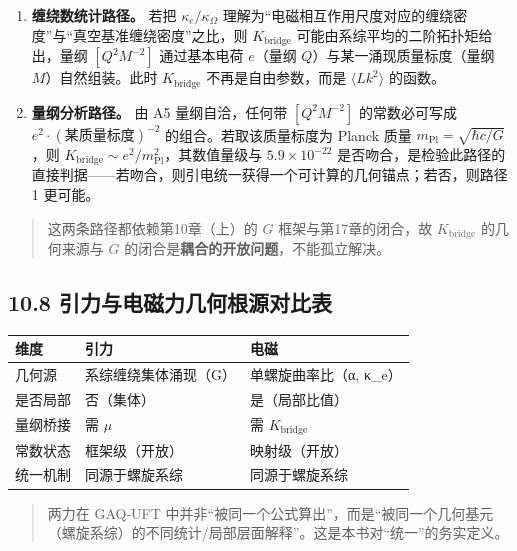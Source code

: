 \begin{enumerate}
\def\labelenumi{\arabic{enumi}.}
\tightlist
\item
  \textbf{缠绕数统计路径。} 若把 \(\kappa_e/\kappa_\Omega\)
  理解为``电磁相互作用尺度对应的缠绕密度''与``真空基准缠绕密度''之比，则
  \(K_{\mathrm{bridge}}\) 可能由系综平均的二阶拓扑矩给出，量纲
  \([Q^2M^{-2}]\) 通过基本电荷 \(e\)（量纲
  \(Q\)）与某一涌现质量标度（量纲 \(M\)）自然组装。此时
  \(K_{\mathrm{bridge}}\) 不再是自由参数，而是 \(\langle Lk^2\rangle\)
  的函数。
\item
  \textbf{量纲分析路径。} 由 A5 量纲自洽，任何带 \([Q^2M^{-2}]\)
  的常数必可写成 \(e^2\cdot(\text{某质量标度})^{-2}\)
  的组合。若取该质量标度为 Planck 质量
  \(m_{\mathrm{Pl}}=\sqrt{\hbar c/G}\)，则
  \(K_{\mathrm{bridge}}\sim e^2/m_{\mathrm{Pl}}^2\)，其数值量级与
  \(5.9\times10^{-22}\)
  是否吻合，是检验此路径的直接判据------若吻合，则引电统一获得一个可计算的几何锚点；若否，则路径
  1 更可能。
\end{enumerate}

\begin{quote}
这两条路径都依赖第10章（上）的 \(G\) 框架与第17章的闭合，故
\(K_{\mathrm{bridge}}\) 的几何来源与 \(G\)
的闭合是\textbf{耦合的开放问题}，不能孤立解决。
\end{quote}

\subsection{10.8
引力与电磁力几何根源对比表}\label{ux5f15ux529bux4e0eux7535ux78c1ux529bux51e0ux4f55ux6839ux6e90ux5bf9ux6bd4ux8868}

\begin{longtable}[]{@{}lll@{}}
\toprule\noalign{}
维度 & 引力 & 电磁 \\
\midrule\noalign{}
\endhead
\bottomrule\noalign{}
\endlastfoot
几何源 & 系综缠绕集体涌现（G） & 单螺旋曲率比（α, κ\_e） \\
是否局部 & 否（集体） & 是（局部比值） \\
量纲桥接 & 需 \(\mu\) & 需 \(K_{\mathrm{bridge}}\) \\
常数状态 & 框架级（开放） & 映射级（开放） \\
统一机制 & 同源于螺旋系综 & 同源于螺旋系综 \\
\end{longtable}

\begin{quote}
两力在 GAQ‑UFT
中并非``被同一个公式算出''，而是``被同一个几何基元（螺旋系综）的不同统计/局部层面解释''。这是本书对``统一''的务实定义。
\end{quote}

